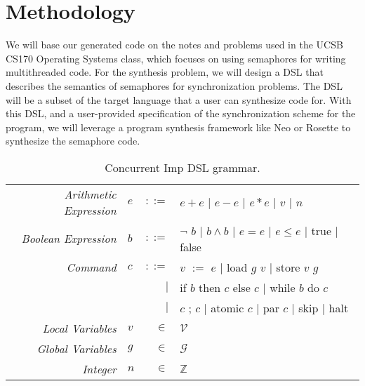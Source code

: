 \section{Methodology}

We will base our generated code on the notes and problems used in the UCSB CS170 Operating Systems class, which focuses on using semaphores for writing multithreaded code.     For the synthesis problem, we will design a DSL that describes the semantics of semaphores for synchronization problems. The DSL will be a subset of the target language that a user can synthesize code for.  With this DSL, and a user-provided specification of the synchronization scheme for the program, we will leverage a program synthesis framework like Neo or Rosette to synthesize the semaphore code.

\begin{table}[!htbp]
\centering
\begin{tabular}{ r l r l }
\emph{Arithmetic Expression} & $e$ & $::=$ & $e + e$ 
                                         $|$ $e - e$ 
                                         $|$ $e * e$ 
                                         $|$ $v$ 
                                         $|$ $n$ \\
\emph{Boolean Expression} & $b$ & $::=$ & $\neg$ $b$ 
                                      $|$ $b \wedge b$ 
                                      $|$ $e = e$ 
                                      $|$ $e \leq e$ 
                                      $|$ true 
                                      $|$ false \\
\emph{Command} & $c$ & $::=$ & $v$ $:=$ $e$ 
                             $|$   load $g$ $v$
                             $|$   store $v$ $g$ \\ 
               &     &       $|$ & if $b$ then $c$ else $c$
                             $|$   while $b$ do $c$ \\
               &     &       $|$ & $c$ ; $c$
                             $|$   atomic $c$
                             $|$   par $c$
                             $|$   skip 
                             $|$   halt 
                               \\
\emph{Local Variables} & $v$ & $\in$ & $\mathcal{V}$ \\
\emph{Global Variables} & $g$ & $\in$ & $\mathcal{G}$ \\
\emph{Integer} & $n$ & $\in$ & $\mathbb{Z}$ \\
\end{tabular}
\caption{
Concurrent Imp DSL grammar. 
}
\label{tab:dsl}
\end{table}

